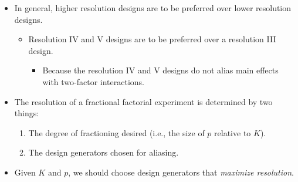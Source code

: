 \begin{itemize}[*]
      \item In general, higher resolution designs are to be preferred over lower resolution designs.
            \begin{itemize}
                  \item Resolution IV and V designs are to be preferred over a resolution III design.
                        \begin{itemize}[$\hookrightarrow$]
                              \item Because the resolution IV and V designs do not alias main effects with two-factor interactions.
                        \end{itemize}
            \end{itemize}
\end{itemize}
\begin{itemize}
      \item The resolution of a fractional factorial experiment is determined by two things:
            \begin{enumerate}[1.]
                  \item The degree of fractioning desired (i.e., the size of $p$ relative to $K$).
                  \item The design generators chosen for aliasing.
            \end{enumerate}
\end{itemize}
\begin{itemize}[*]
      \item Given $K$ and $p$, we should choose design generators that \emph{maximize resolution}.
\end{itemize}
